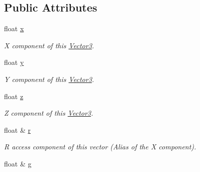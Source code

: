 \subsection*{Public Attributes}
\begin{DoxyCompactItemize}
\item 
\hypertarget{classchaos_1_1gfx_1_1_vector3_ac58f0d4a6e611ae3eec8e9f56476fc13}{}float \hyperlink{classchaos_1_1gfx_1_1_vector3_ac58f0d4a6e611ae3eec8e9f56476fc13}{x}\label{classchaos_1_1gfx_1_1_vector3_ac58f0d4a6e611ae3eec8e9f56476fc13}

\begin{DoxyCompactList}\small\item\em X component of this \hyperlink{classchaos_1_1gfx_1_1_vector3}{Vector3}. \end{DoxyCompactList}\item 
\hypertarget{classchaos_1_1gfx_1_1_vector3_ac001a2e7468d6c6cfc5119d486817f0b}{}float \hyperlink{classchaos_1_1gfx_1_1_vector3_ac001a2e7468d6c6cfc5119d486817f0b}{y}\label{classchaos_1_1gfx_1_1_vector3_ac001a2e7468d6c6cfc5119d486817f0b}

\begin{DoxyCompactList}\small\item\em Y component of this \hyperlink{classchaos_1_1gfx_1_1_vector3}{Vector3}. \end{DoxyCompactList}\item 
\hypertarget{classchaos_1_1gfx_1_1_vector3_a7ec457e7ef3054557dacdc89bf7ce77b}{}float \hyperlink{classchaos_1_1gfx_1_1_vector3_a7ec457e7ef3054557dacdc89bf7ce77b}{z}\label{classchaos_1_1gfx_1_1_vector3_a7ec457e7ef3054557dacdc89bf7ce77b}

\begin{DoxyCompactList}\small\item\em Z component of this \hyperlink{classchaos_1_1gfx_1_1_vector3}{Vector3}. \end{DoxyCompactList}\item 
\hypertarget{classchaos_1_1gfx_1_1_vector3_a1871c73a8c5f77294a62c9de0c6b17f6}{}float \& \hyperlink{classchaos_1_1gfx_1_1_vector3_a1871c73a8c5f77294a62c9de0c6b17f6}{r}\label{classchaos_1_1gfx_1_1_vector3_a1871c73a8c5f77294a62c9de0c6b17f6}

\begin{DoxyCompactList}\small\item\em R access component of this vector (Alias of the X component). \end{DoxyCompactList}\item 
\hypertarget{classchaos_1_1gfx_1_1_vector3_a3ecbc6e07f1b55f11e6174e173ce67df}{}float \& \hyperlink{classchaos_1_1gfx_1_1_vector3_a3ecbc6e07f1b55f11e6174e173ce67df}{g}\label{classchaos_1_1gfx_1_1_vector3_a3ecbc6e07f1b55f11e6174e173ce67df}


\end{DoxyCompactItemize}
